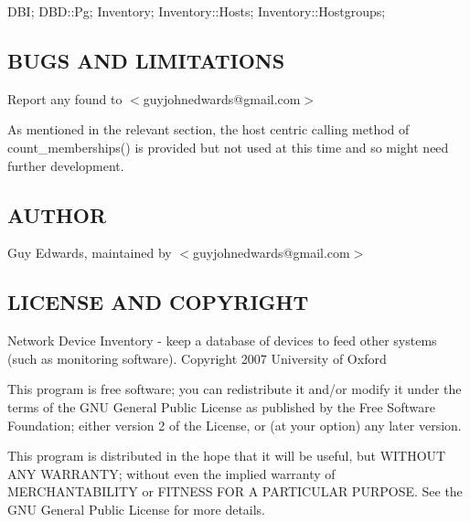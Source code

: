 \documentclass{book}
\begin{document}
DBI; DBD::Pg; Inventory; Inventory::Hosts; Inventory::Hostgroups;


\subsection{BUGS AND LIMITATIONS}
\label{Inventory::Memberships_BUGS_AND_LIMITATIONS}
\hypertarget{Inventory::Memberships_BUGS_AND_LIMITATIONS}{}



Report any found to $<$guyjohnedwards@gmail.com$>$



As mentioned in the relevant section, the host centric calling method of count\_memberships() is provided but not used at this time and so might need further development.


\subsection{AUTHOR}
\label{Inventory::Memberships_AUTHOR}
\hypertarget{Inventory::Memberships_AUTHOR}{}



Guy Edwards, maintained by $<$guyjohnedwards@gmail.com$>$


\subsection{LICENSE AND COPYRIGHT}
\label{Inventory::Memberships_LICENSE_AND_COPYRIGHT}
\hypertarget{Inventory::Memberships_LICENSE_AND_COPYRIGHT}{}



Network Device Inventory - keep a database of devices to feed other systems (such as monitoring software). Copyright 2007 University of Oxford



This program is free software; you can redistribute it and/or modify it under the terms of the GNU General Public License as published by the Free Software Foundation; either version 2 of the License, or (at your option) any later version.



This program is distributed in the hope that it will be useful, but WITHOUT ANY WARRANTY; without even the implied warranty of MERCHANTABILITY or FITNESS FOR A PARTICULAR PURPOSE. See the GNU General Public License for more details.
\end{document}
